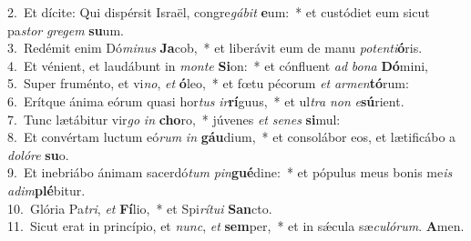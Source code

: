 {2.~}Et dícite: Qui dispérsit Israël, congre\textit{gá}\textit{bit} \textbf{e}um:~* et custódiet eum sicut pa\textit{stor} \textit{gre}\textit{gem} \textbf{su}um.\\
{3.~}Redémit enim Dó\textit{mi}\textit{nus} \textbf{Ja}cob,~* et liberávit eum de manu \textit{po}\textit{ten}\textit{ti}\textbf{ó}ris.\\
{4.~}Et vénient, et laudábunt in \textit{mon}\textit{te} \textbf{Si}on:~* et cónfluent \textit{ad} \textit{bo}\textit{na} \textbf{Dó}mini,\\
{5.~}Super fruménto, et vi\textit{no}, \textit{et} \textbf{ó}leo,~* et fœtu pécorum \textit{et} \textit{ar}\textit{men}\textbf{tó}rum:\\
{6.~}Erítque ánima eórum quasi hor\textit{tus} \textit{ir}\textbf{rí}guus,~* et ul\textit{tra} \textit{non} \textit{e}\textbf{sú}rient.\\
{7.~}Tunc lætábitur vir\textit{go} \textit{in} \textbf{cho}ro,~* júvenes \textit{et} \textit{se}\textit{nes} \textbf{si}mul:\\
{8.~}Et convértam luctum eó\textit{rum} \textit{in} \textbf{gáu}dium,~* et consolábor eos, et lætificábo a \textit{do}\textit{ló}\textit{re} \textbf{su}o.\\
{9.~}Et inebriábo ánimam sacerdó\textit{tum} \textit{pin}\textbf{gué}dine:~* et pópulus meus bonis me\textit{is} \textit{a}\textit{dim}\textbf{plé}bitur.\\
{10.~}Glória Pa\textit{tri}, \textit{et} \textbf{Fí}lio,~* et Spi\textit{rí}\textit{tu}\textit{i} \textbf{San}cto.\\
{11.~}Sicut erat in princípio, et \textit{nunc}, \textit{et} \textbf{sem}per,~* et in sǽcula sæ\textit{cu}\textit{ló}\textit{rum}. \textbf{A}men.\\
